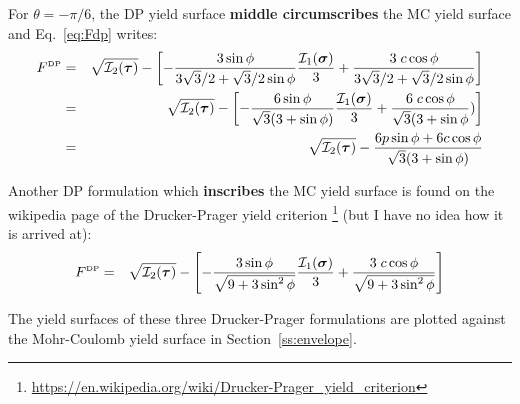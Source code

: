 For $\theta=-\pi/6$, the DP yield surface {\bf middle circumscribes} the MC yield surface 
and Eq.~\eqref{eq:Fdp} writes:
\begin{eqnarray}
F^{\text{\tiny DP}}
&=& \sqrt{{\cal I}_2({\bm \tau})} 
- \left[ -\frac{3 \sin\phi}{ 3 \sqrt{3}/2 + \sqrt{3}/2 \sin\phi}  \frac{{\cal I}_1({\bm \sigma})}{3}
+ \frac{ 3\; c \cos \phi }{ 3 \sqrt{3}/2 + \sqrt{3}/2 \sin\phi} \right] \nonumber\\
&=& \sqrt{{\cal I}_2({\bm \tau})} 
- \left[ -\frac{6 \sin\phi}{\sqrt{3} (3 + \sin\phi) }  \frac{{\cal I}_1({\bm \sigma})}{3}
+ \frac{ 6\; c \cos \phi }{ \sqrt{3}(3 + \sin\phi}) \right] \nonumber\\
&=& \sqrt{{\cal I}_2({\bm \tau})} 
- \frac{6 p \sin\phi + 6 c \cos \phi}{\sqrt{3} (3 + \sin\phi) } 
\end{eqnarray}

Another DP formulation which {\bf inscribes} the MC yield surface is found on the 
wikipedia page of the Drucker-Prager yield criterion
\footnote{\url{https://en.wikipedia.org/wiki/Drucker-Prager_yield_criterion}}
(but I have no idea how it is arrived at):
\begin{eqnarray}
F^{\text{\tiny DP}}
&=& \sqrt{{\cal I}_2({\bm \tau})} 
- \left[ -\frac{3 \sin\phi}{\sqrt{9+3\sin^2\phi} }  \frac{{\cal I}_1({\bm \sigma})}{3}
+ \frac{ 3\; c \cos \phi }{ \sqrt{9+3\sin^2\phi} } \right] \label{eq:dp3}
\end{eqnarray}

The yield surfaces of these three Drucker-Prager formulations are plotted against the Mohr-Coulomb
yield surface in Section~\ref{ss:envelope}. 







